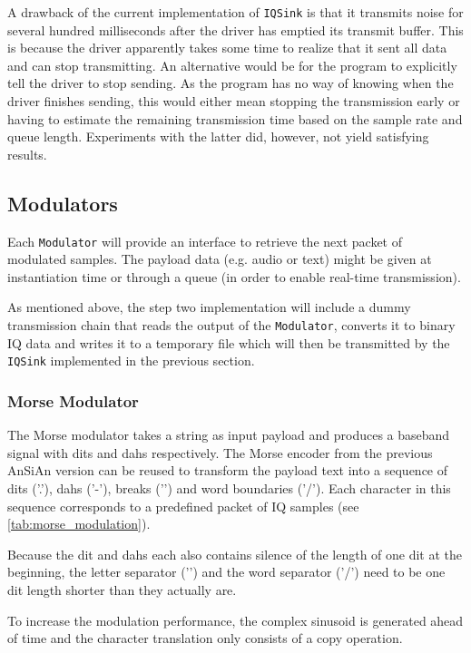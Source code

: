 A drawback of the current implementation of \texttt{IQSink} is that it transmits noise for several hundred milliseconds after the driver has emptied its transmit buffer. This is because the driver apparently takes some time to realize that it sent all data and can stop transmitting. An alternative would be for the program to explicitly tell the driver to stop sending. As the program has no way of knowing when the driver finishes sending, this would either mean stopping the transmission early or having to estimate the remaining transmission time based on the sample rate and queue length. Experiments with the latter did, however, not yield satisfying results.


\subsection{Modulators}

Each \texttt{Modulator} will provide an interface to retrieve the next packet of
modulated samples. The payload data (e.g. audio or text) might be given at
instantiation time or through a queue (in order to enable real-time transmission).

As mentioned above, the step two implementation will include a dummy transmission
chain that reads the output of the \texttt{Modulator}, converts it to binary IQ
data and writes it to a temporary file which will then be transmitted by the
\texttt{IQSink} implemented in the previous section.


\subsubsection{Morse Modulator}

The Morse modulator takes a string as input payload and produces a baseband
signal with dits and dahs respectively. The Morse encoder from the previous
\ac{AnSiAn} version can be reused to transform the payload text into a
sequence of dits ('.'), dahs ('-'), breaks ('\textvisiblespace') and word
boundaries ('/'). Each character in this sequence corresponds to a predefined
packet of IQ samples (see \autoref{tab:morse_modulation}).

Because the dit and dahs each also contains silence of the length of one dit at
the beginning, the letter separator ('\textvisiblespace') and the word separator
('/') need to be one dit length shorter than they actually are.

To increase the modulation performance, the complex sinusoid is generated
ahead of time and the character translation only consists of a copy operation.


